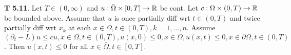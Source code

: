 {\bf T 5.11}. Let $T \in (0, \infty)$ and $u: \bar{\Omega} \times [0,T] \rightarrow \mathbb{R}$ be cont. Let $c: \Omega \times (0,T) \rightarrow \mathbb{R}$ be bounded above. Assume that $u$ is once partially diff wrt $t \in (0,T)$ and twice partially diff wrt $x_k$ at each $x \in \Omega, t \in (0, T), k = 1, \dots, n$. Assume $(\partial_t -L)u \leq cu, x \in \Omega, t \in (0,T), u(x,0) \leq 0, x \in \bar{\Omega}, u(x,t)\leq 0, x \in \partial \Omega, t \in (0,T)$. Then $u(x,t) \leq 0$ for all $x \in \bar{\Omega}, t \in [0,T]$. %